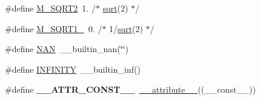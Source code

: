 \begin{DoxyCompactItemize}
\item 
\#define \hyperlink{group__avr__math_ga66b3ab30f1332874326ed93969e496e0}{M\+\_\+\+S\+Q\+R\+T2}~1.	/$\ast$ \hyperlink{group__avr__math_gaac21324d984f0af0fb87a613efb69d77}{sqrt}(2) $\ast$/
\item 
\#define \hyperlink{group__avr__math_gacdbb2c2f9429f08916f03c8786d2d2d7}{M\+\_\+\+S\+Q\+R\+T1\+\_}~0.	/$\ast$ 1/\hyperlink{group__avr__math_gaac21324d984f0af0fb87a613efb69d77}{sqrt}(2) $\ast$/
\item 
\#define \hyperlink{group__avr__math_ga8abfcc76130f3f991d124dd22d7e69bc}{N\+AN}~\+\_\+\+\_\+builtin\+\_\+nan(\char`\"{}\char`\"{})
\item 
\#define \hyperlink{group__avr__math_ga956e2723d559858d08644ac99146e910}{I\+N\+F\+I\+N\+I\+TY}~\+\_\+\+\_\+builtin\+\_\+inf()
\item 
\#define {\bfseries \+\_\+\+\_\+\+A\+T\+T\+R\+\_\+\+C\+O\+N\+S\+T\+\_\+\+\_\+}~\hyperlink{stdint_8h_a772744ca0816d59e120b8f8a1ede64f0}{\+\_\+\+\_\+attribute\+\_\+\+\_\+}((\+\_\+\+\_\+const\+\_\+\+\_\+))\hypertarget{group__avr__math_ga87f6b1b3880d945610873b9da382e5d4}{}\label{group__avr__math_ga87f6b1b3880d945610873b9da382e5d4}


\end{DoxyCompactItemize}
